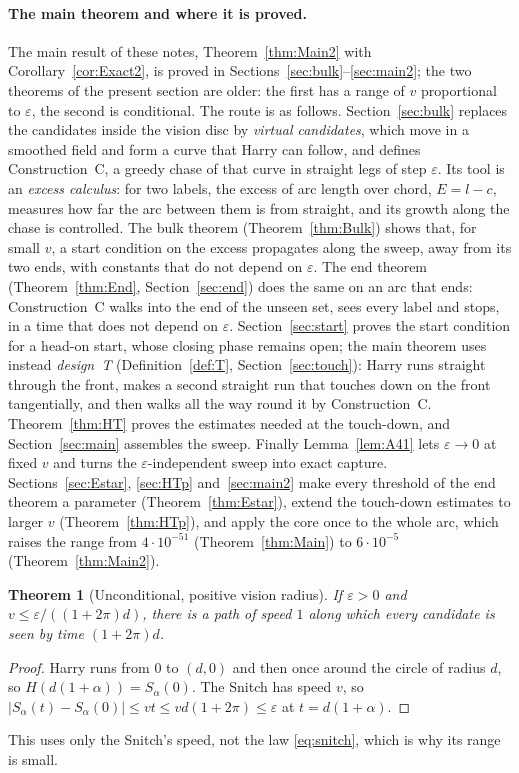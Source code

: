 \documentclass[11pt]{article}
\newtheorem{theorem}{Theorem}
\theoremstyle{remark}\newtheorem{remark}{Remark}
\begin{document}
\paragraph{The main theorem and where it is proved.} The main result of these notes, Theorem~\ref{thm:Main2} with
Corollary~\ref{cor:Exact2}, is proved in Sections~\ref{sec:bulk}--\ref{sec:main2}; the two theorems of the present section are older:
the first has a range of $v$ proportional to $\varepsilon$, the second is conditional. The route is as follows. Section~\ref{sec:bulk} replaces the candidates inside the vision disc
by \emph{virtual candidates}, which move in a smoothed field and form a curve that Harry can follow, and defines Construction~C, a
greedy chase of that curve in straight legs of step $\varepsilon$. Its tool is an \emph{excess calculus}: for two labels, the
excess of arc length over chord, $E=l-c$, measures how far the arc between them is from straight, and its growth along the chase
is controlled. The bulk theorem (Theorem~\ref{thm:Bulk}) shows that, for small $v$, a start condition on the excess propagates
along the sweep, away from its two ends, with constants that do not depend on $\varepsilon$. The end theorem
(Theorem~\ref{thm:End}, Section~\ref{sec:end}) does the same on an arc that ends: Construction~C walks into the end of the unseen
set, sees every label and stops, in a time that does not depend on $\varepsilon$. Section~\ref{sec:start} proves the start
condition for a head-on start, whose closing phase remains open; the main theorem uses instead \emph{design~T}
(Definition~\ref{def:T}, Section~\ref{sec:touch}): Harry runs straight through the front, makes a second straight run that
touches down on the front tangentially, and then walks all the way round it by Construction~C. Theorem~\ref{thm:HT} proves the
estimates needed at the touch-down, and Section~\ref{sec:main} assembles the sweep. Finally Lemma~\ref{lem:A41} lets
$\varepsilon\to0$ at fixed $v$ and turns the $\varepsilon$-independent sweep into exact capture. Sections~\ref{sec:Estar},
\ref{sec:HTp} and~\ref{sec:main2} make every threshold of the end theorem a parameter (Theorem~\ref{thm:Estar}), extend the
touch-down estimates to larger $v$ (Theorem~\ref{thm:HTp}), and apply the core once to the whole arc, which raises the range from
$4\cdot10^{-51}$ (Theorem~\ref{thm:Main}) to $6\cdot10^{-5}$ (Theorem~\ref{thm:Main2}).

\begin{theorem}[Unconditional, positive vision radius]\label{thm:A}
If $\varepsilon>0$ and $v\le\varepsilon/((1+2\pi)d)$, there is a path of speed $1$ along which every candidate is seen by
time $(1+2\pi)d$.
\end{theorem}
\begin{proof}
Harry runs from $0$ to $(d,0)$ and then once around the circle of radius $d$, so $H(d(1+\alpha))=S_\alpha(0)$.
The Snitch has speed $v$, so $|S_\alpha(t)-S_\alpha(0)|\le vt\le v d(1+2\pi)\le\varepsilon$ at $t=d(1+\alpha)$.
\end{proof}
This uses only the Snitch's speed, not the law \eqref{eq:snitch}, which is why its range is small.
\end{document}
